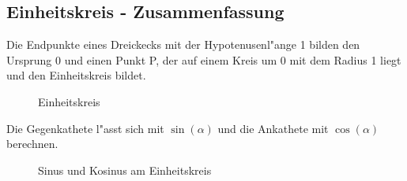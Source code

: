 \documentclass{standalone}
\begin{document}
\subsection{Einheitskreis - Zusammenfassung}

\noindent Die Endpunkte eines Dreickecks mit der Hypotenusenl{"a}nge 1 bilden den Ursprung 0 und einen Punkt P, der auf einem Kreis um 0 mit dem Radius 1 liegt und den Einheitskreis bildet.

\begin{figure}[hb!]
  \center
  \def\svgwidth{200px}
  
  \caption{Einheitskreis}
  \label{fig:0_alpha_90_360}
\end{figure}

\noindent Die Gegenkathete l{"a}sst sich mit $\sin(\alpha)$ und die Ankathete mit $\cos(\alpha)$ berechnen. 

\begin{figure}[hb!]
	\centering
	\def\svgwidth{200px}
	
	\caption{Sinus und Kosinus am Einheitskreis}
	\label{fig:sin_cos_einheitskreis}
\end{figure}
\end{document}
